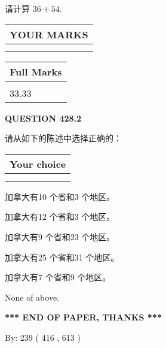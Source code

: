 \documentclass{ctexart}
\begin{document}
  
 
请计算 $ %
36 +  %
54 $.
 

 

 
  
\vspace{0.2in}
  
\noindent\begin{tabular}{|l|}
\hline
 YOUR MARKS  \\
\hline
 \\ 
 \\ 
\hline
\end{tabular}
\hspace{0.05in} \begin{tabular}{|l|}
\hline
 Full Marks  \\
\hline
 \\ 
33.33 \\
\hline
\end{tabular}
{\textbf{\Large{QUESTION
428.2 
}}}
  
  
请从如下的陈述中选择正确的：
  
  
\noindent\hspace{3.0in} \begin{tabular}{|l|}
\hline
Your choice \\
\hline
 \\ 
 \\ 
\hline
\end{tabular}
  
  
 
 
加拿大有10 个省和3 个地区。
 
 
加拿大有12 个省和3 个地区。
 
 
加拿大有9 个省和23 个地区。
 
 
加拿大有25 个省和31 个地区。
 
 
加拿大有7 个省和9 个地区。
 
 
 None of above.
 
 
   
   
 \vspace{0.2in}
 
   
   
   
   
\vspace{1.0in} 
{\textbf{\large{ *** END OF PAPER, THANKS *** }}} 
   
   
\hspace{1.0in} By: 
 239 ( 416 ,  613 )
   
\end{document}
